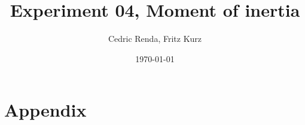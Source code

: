 \documentclass[12pt,a4paper]{article}
\title{Experiment 04, Moment of inertia}
\author{Cedric Renda, Fritz Kurz}
\date{\today }
\begin{document}
\maketitle




\tableofcontents







\newpage

\section{Appendix}

\end{document}
